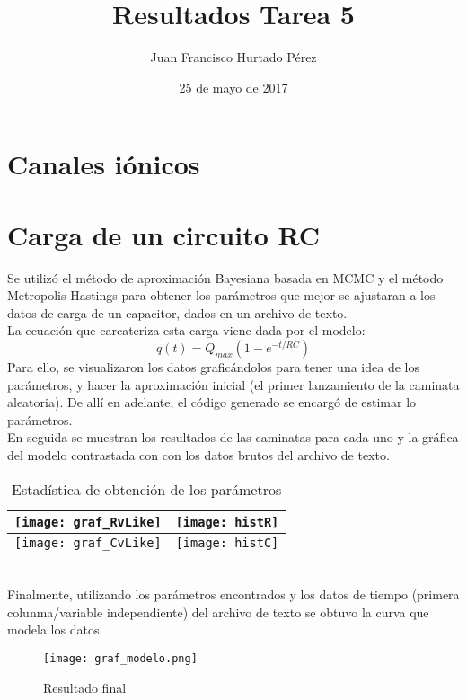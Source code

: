 \documentclass{article}
\title{Resultados Tarea 5}
\author{Juan Francisco Hurtado P\'erez}
\date{25 de mayo de 2017}
\begin{document}
\maketitle

\section{Canales i\'onicos}

\section{Carga de un circuito RC}
Se utiliz\'o el m\'etodo de aproximaci\'on Bayesiana basada en MCMC y el m\'etodo Metropolis-Hastings para obtener los par\'ametros que mejor se ajustaran a los datos de carga de un capacitor, dados en un archivo de texto.\\
La ecuaci\'on que carcateriza esta carga viene dada por el modelo:\\
\begin{equation}
    q(t) = Q_{max}(1-e^{-t/RC})
\end{equation}
Para ello, se visualizaron los datos grafic\'andolos para tener una idea de los par\'ametros, y hacer la aproximaci\'on inicial (el primer lanzamiento de la caminata aleatoria). De all\'i en adelante, el c\'odigo generado se encarg\'o de estimar lo par\'ametros. \\
En seguida se muestran los resultados de las caminatas para cada uno y la gr\'afica del modelo contrastada con con los datos brutos del archivo de texto.\\
\begin{table}
    \centering
    \begin{tabular}{|cc|}
        \hline
        \texttt{[image: graf\_RvLike]} & \texttt{[image: histR]} \\
        \hline
        \texttt{[image: graf\_CvLike]} & \texttt{[image: histC]} \\
        \hline
    \end{tabular}
    \caption{Estad\'istica de obtenci\'on de los par\'ametros}
\end{table}\\
Finalmente, utilizando los par\'ametros encontrados y los datos de tiempo (primera colunma/variable independiente) del archivo de texto se obtuvo la curva que modela los datos.\\
\begin{figure}
    \centering
    \texttt{[image: graf\_modelo.png]}
    \caption{Resultado final}
\end{figure}
\end{document}

